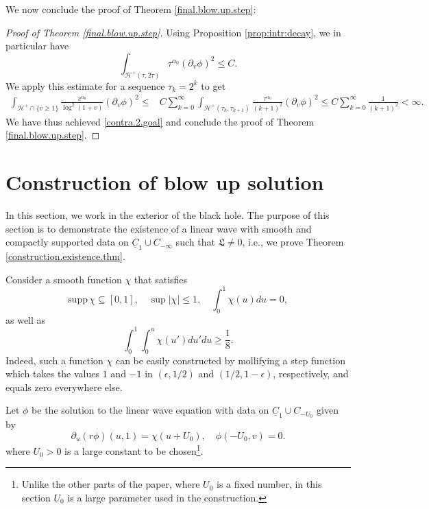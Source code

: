 \documentclass[12 pt, reqno]{amsart}
\theoremstyle{definition}
\theoremstyle{remark}
\numberwithin{equation}{section}
\newcommand{\abs}[1]{\vert#1\vert}
\newcommand{\ud}{d}
\newcommand{\rd}{\partial}
\newcommand{\0}{\emptyset}
\newcommand{\alp}{\alpha}
\newcommand{\eps}{\epsilon}
\newcommand{\calH}{\mathcal H}
\newcommand{\uC}{\underline{C}}
\newcommand{\f}{\frac}
\newcommand{\EH}{\calH^{+}}
\newcommand{\Ufree}{U_{0}}
\begin{document}
We now conclude the proof of Theorem \ref{final.blow.up.step}:
\begin{proof}[Proof of Theorem \ref{final.blow.up.step}]
Using Proposition \ref{prop:intr:decay}, we in particular have 
$$\int_{\mathcal H^+(\tau,2\tau)} \tau^{\alp_0} (\rd_v\phi)^2 \leq C.$$
We apply this estimate for a sequence $\tau_k=2^k$ to get
\begin{equation*}
\begin{split}
\int_{\EH\cap\{v\geq 1\}} \f{v^{\alp_0}}{\log^2(1+v)}(\rd_v\phi)^2\leq &C\sum_{k=0}^\infty \int_{\mathcal H^+(\tau_k,\tau_{k+1})} \f{\tau^{\alp_0}}{(k+1)^2}(\rd_v\phi)^2\leq C\sum_{k=0}^{\infty}\f{1}{(k+1)^2}<\infty.
\end{split}
\end{equation*}
We have thus achieved \eqref{contra.2.goal} and conclude the proof of Theorem \ref{final.blow.up.step}.
\qedhere
\end{proof}


\section{Construction of blow up solution}\label{sec.construction}
In this section, we work in the exterior of the black hole.
The purpose of this section is to demonstrate the existence of a linear wave with smooth and compactly supported data on $\uC_{1} \cup C_{-\infty}$ such that $\mathfrak{L} \neq 0$, i.e., we prove Theorem \ref{construction.existence.thm}.

Consider a smooth function $\chi$ that satisfies 
\begin{equation} \label{eq:pert:chi}
	\mathrm{supp} \, \chi \subseteq [0, 1], \quad \sup \abs{\chi} \leq 1, \quad \int_0^1 \chi(u) \ud u = 0,
\end{equation}
as well as
\begin{equation} \label{eq:pert:chi:lb}
	\int_{0}^{1} \int_{0}^{u} \chi(u') \ud u' \ud u \geq \frac{1}{8}.
\end{equation}
Indeed, such a function $\chi$ can be easily constructed by mollifying a step function which takes the values $1$ and $-1$ in $(\eps, 1/2)$ and $(1/2, 1-\eps)$, respectively, and equals zero everywhere else.

Let $\phi$ be the solution to the linear wave equation with data on $\uC_{1} \cup C_{-\Ufree}$ given by
\begin{equation} \label{eq:pert:id}
	\rd_{u}(r \phi)(u, 1) = \chi(u + \Ufree), \quad
	\phi(-\Ufree, v) = 0.
\end{equation}
where $\Ufree > 0$ is a large constant to be chosen\footnote{Unlike the other parts of the paper, where $U_{0}$ is a fixed number, in this section $U_{0}$ is a large parameter used in the construction.}.
\end{document}
